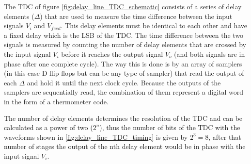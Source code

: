\begin{center}
        \label{fig:delay_line_TDC_schematic}
    \end{center}

The TDC of figure \ref{fig:delay_line_TDC_schematic} consists of a series of delay elements ($\Delta$) that are used to measure the time difference between the input signals $V_i$ 
and $V_{feed}$. This delay elements must be identical to each other and have a fixed delay which is the LSB of the TDC. The time difference between the two signals is measured by counting
the number of delay elements that are crossed by the input signal $V_i$ before it reaches the output signal $V_o$ (and both signals are in phase after one complete cycle). The way this is done is by an array of samplers (in this case D flip-flops
but can be any type of sampler) that read the output of each $\Delta$ and hold it until the next clock cycle. Because the outputs of the samplers are sequentially read, the combination
of them represent a digital word in the form of a thermometer code.

The number of delay elements determines the resolution of the TDC and can be calculated as a power of two ($2^n$), thus the number of bits of the TDC with the
waveforms shown in \ref{fig:delay_line_TDC_timing} is given by $2^3 = 8$, after that number of stages the output of the nth delay element would be in phase with the input signal $V_i$.

